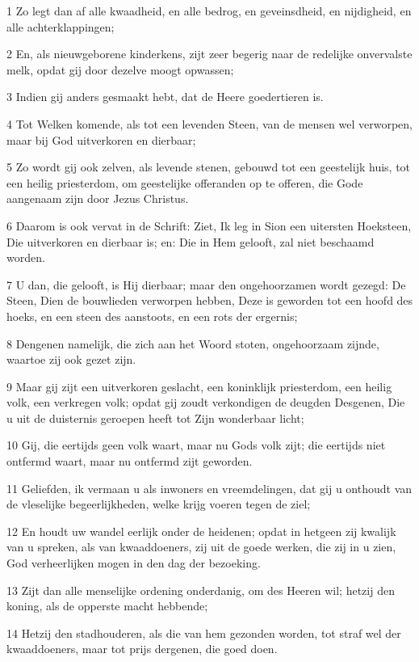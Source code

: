 \par 1 Zo legt dan af alle kwaadheid, en alle bedrog, en geveinsdheid, en nijdigheid, en alle achterklappingen;
\par 2 En, als nieuwgeborene kinderkens, zijt zeer begerig naar de redelijke onvervalste melk, opdat gij door dezelve moogt opwassen;
\par 3 Indien gij anders gesmaakt hebt, dat de Heere goedertieren is.
\par 4 Tot Welken komende, als tot een levenden Steen, van de mensen wel verworpen, maar bij God uitverkoren en dierbaar;
\par 5 Zo wordt gij ook zelven, als levende stenen, gebouwd tot een geestelijk huis, tot een heilig priesterdom, om geestelijke offeranden op te offeren, die Gode aangenaam zijn door Jezus Christus.
\par 6 Daarom is ook vervat in de Schrift: Ziet, Ik leg in Sion een uitersten Hoeksteen, Die uitverkoren en dierbaar is; en: Die in Hem gelooft, zal niet beschaamd worden.
\par 7 U dan, die gelooft, is Hij dierbaar; maar den ongehoorzamen wordt gezegd: De Steen, Dien de bouwlieden verworpen hebben, Deze is geworden tot een hoofd des hoeks, en een steen des aanstoots, en een rots der ergernis;
\par 8 Dengenen namelijk, die zich aan het Woord stoten, ongehoorzaam zijnde, waartoe zij ook gezet zijn.
\par 9 Maar gij zijt een uitverkoren geslacht, een koninklijk priesterdom, een heilig volk, een verkregen volk; opdat gij zoudt verkondigen de deugden Desgenen, Die u uit de duisternis geroepen heeft tot Zijn wonderbaar licht;
\par 10 Gij, die eertijds geen volk waart, maar nu Gods volk zijt; die eertijds niet ontfermd waart, maar nu ontfermd zijt geworden.
\par 11 Geliefden, ik vermaan u als inwoners en vreemdelingen, dat gij u onthoudt van de vleselijke begeerlijkheden, welke krijg voeren tegen de ziel;
\par 12 En houdt uw wandel eerlijk onder de heidenen; opdat in hetgeen zij kwalijk van u spreken, als van kwaaddoeners, zij uit de goede werken, die zij in u zien, God verheerlijken mogen in den dag der bezoeking.
\par 13 Zijt dan alle menselijke ordening onderdanig, om des Heeren wil; hetzij den koning, als de opperste macht hebbende;
\par 14 Hetzij den stadhouderen, als die van hem gezonden worden, tot straf wel der kwaaddoeners, maar tot prijs dergenen, die goed doen.
